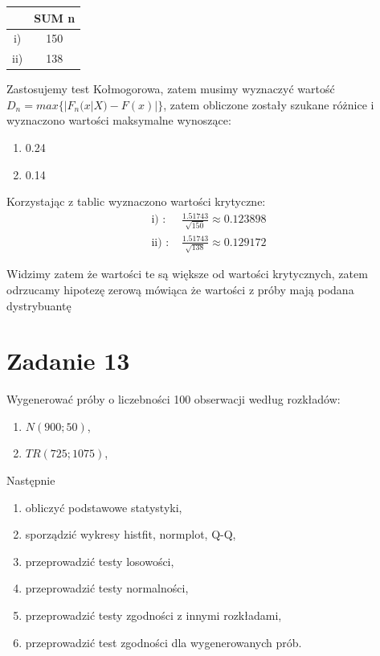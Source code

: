 \documentclass{article}
\begin{document}
\begin{center} \begin{tabular}{|c|c|} \hline
 & SUM n \\ \hline
i) & 150 \\ \hline
ii) & 138 \\ \hline
\end{tabular} \end{center}

Zastosujemy test Kołmogorowa, zatem musimy wyznaczyć wartość $D_n = max\{ |F_n(x|X) - F(x) | \}$, zatem obliczone zostały szukane różnice i wyznaczono wartości maksymalne wynoszące:
\begin{enumerate}[label = \roman*)]
\item 0.24
\item 0.14
\end{enumerate}

Korzystając z tablic wyznaczono wartości krytyczne:
\begin{align*}
\text{i) : } & \frac{1.51743}{\sqrt{150}} \approx 0.123898 \\
\text{ii) : } & \frac{1.51743}{\sqrt{138}} \approx 0.129172
\end{align*}

Widzimy zatem że wartości te są większe od wartości krytycznych, zatem odrzucamy hipotezę zerową mówiąca że wartości z próby mają podana dystrybuantę

\newpage
\section{Zadanie 13}
Wygenerować próby o liczebności 100 obserwacji według rozkładów:
\begin{enumerate}[label = \roman*)]
\item $N(900;50)$,
\item $TR(725;1075)$,
\end{enumerate}
Następnie
\begin{enumerate}[label = \alph*)]
\item obliczyć podstawowe statystyki,
\item sporządzić wykresy histfit, normplot, Q-Q,
\item przeprowadzić testy losowości,
\item przeprowadzić testy normalności,
\item przeprowadzić testy zgodności z innymi rozkładami,
\item przeprowadzić test zgodności dla wygenerowanych prób.
\end{enumerate}
\end{document}
